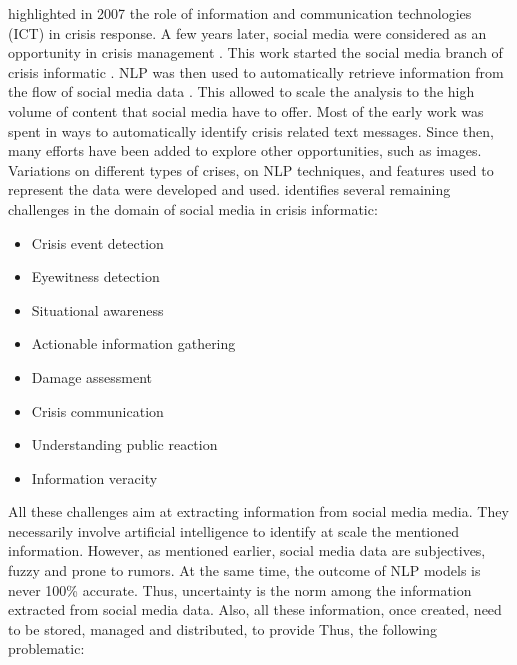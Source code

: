 \cite{palenCitizenCommunicationsCrisis2007} highlighted in 2007 the role of information and communication technologies (ICT) in crisis response.
A few years later, social media were considered as an opportunity in crisis management \cite{viewegMicrobloggingTwoNatural2010a}.
This work started the social media branch of crisis informatic \cite{palenCrisisInformaticsHumancentered2020}.
NLP was then used to automatically retrieve information from the flow of social media data \cite{vermaNaturalLanguageProcessing2011a,carageaClassifyingTextMessages2011a}.
This allowed to scale the analysis to the high volume of content that social media have to offer.
Most of the early work was spent in ways to automatically identify crisis related text messages.
Since then, many efforts have been added to explore other opportunities, such as images.
Variations on different types of crises, on NLP techniques, and features used to represent the data were developed and used.
\cite{imranUsingAISocial2020} identifies several remaining challenges in the domain of social media in crisis informatic:

\begin{itemize}
    \item Crisis event detection
    \item Eyewitness detection
    \item Situational awareness
    \item Actionable information gathering
    \item Damage assessment
    \item Crisis communication
    \item Understanding public reaction
    \item Information veracity
\end{itemize}

All these challenges aim at extracting information from social media media.
They necessarily involve artificial intelligence to identify at scale the mentioned information.
However, as mentioned earlier, social media data are subjectives, fuzzy and prone to rumors.
At the same time, the outcome of NLP models is never 100\% accurate.
Thus, uncertainty is the norm among the information extracted from social media data.
Also, all these information, once created, need to be stored, managed and distributed, to provide
Thus, the following problematic:

\begin{center}
\end{center}

